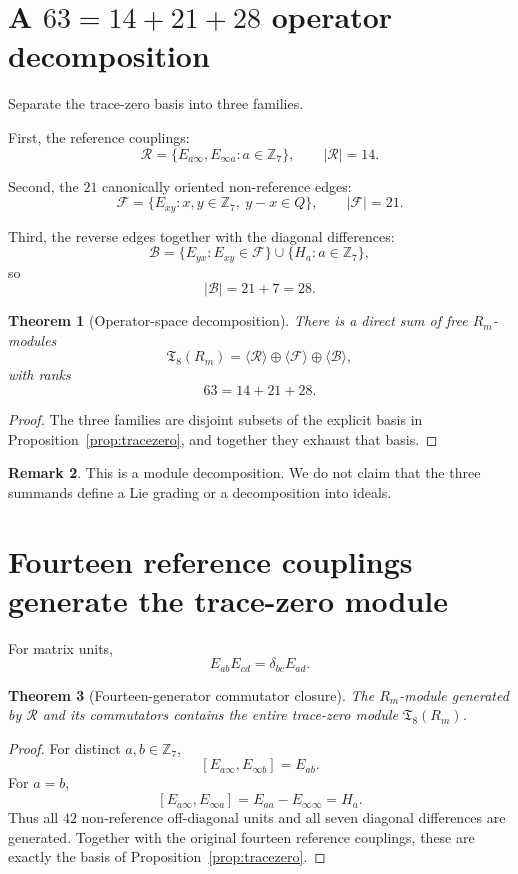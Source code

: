 \documentclass[11pt]{article}
\newtheorem{theorem}{Theorem}
\theoremstyle{definition}
\newtheorem{remark}[theorem]{Remark}
\newcommand{\Z}{\mathbb Z}
\begin{document}
\section{A $63=14+21+28$ operator decomposition}
Separate the trace-zero basis into three families.

First, the reference couplings:
\[
\mathcal R=
\{E_{a\infty},E_{\infty a}:a\in\Z_7\},
\qquad |\mathcal R|=14.
\]

Second, the $21$ canonically oriented non-reference edges:
\[
\mathcal F=
\{E_{xy}:x,y\in\Z_7,\ y-x\in Q\},
\qquad |\mathcal F|=21.
\]

Third, the reverse edges together with the diagonal differences:
\[
\mathcal B=
\{E_{yx}:E_{xy}\in\mathcal F\}
\cup
\{H_a:a\in\Z_7\},
\]
so
\[
|\mathcal B|=21+7=28.
\]

\begin{theorem}[Operator-space decomposition]\label{thm:decomp}
There is a direct sum of free $R_m$-modules
\[
\mathfrak T_8(R_m)
=
\langle\mathcal R\rangle
\oplus
\langle\mathcal F\rangle
\oplus
\langle\mathcal B\rangle,
\]
with ranks
\[
63=14+21+28.
\]
\end{theorem}

\begin{proof}
The three families are disjoint subsets of the explicit basis in Proposition~\ref{prop:tracezero}, and together they exhaust that basis.
\end{proof}

\begin{remark}
This is a module decomposition. We do not claim that the three summands define a Lie grading or a decomposition into ideals.
\end{remark}

\section{Fourteen reference couplings generate the trace-zero module}
For matrix units,
\[
E_{ab}E_{cd}=\delta_{bc}E_{ad}.
\]

\begin{theorem}[Fourteen-generator commutator closure]\label{thm:14gen}
The $R_m$-module generated by $\mathcal R$ and its commutators contains the entire trace-zero module $\mathfrak T_8(R_m)$.
\end{theorem}

\begin{proof}
For distinct $a,b\in\Z_7$,
\[
[E_{a\infty},E_{\infty b}]
=
E_{ab}.
\]
For $a=b$,
\[
[E_{a\infty},E_{\infty a}]
=
E_{aa}-E_{\infty\infty}
=
H_a.
\]
Thus all $42$ non-reference off-diagonal units and all seven diagonal differences are generated. Together with the original fourteen reference couplings, these are exactly the basis of Proposition~\ref{prop:tracezero}.
\end{proof}
\end{document}
